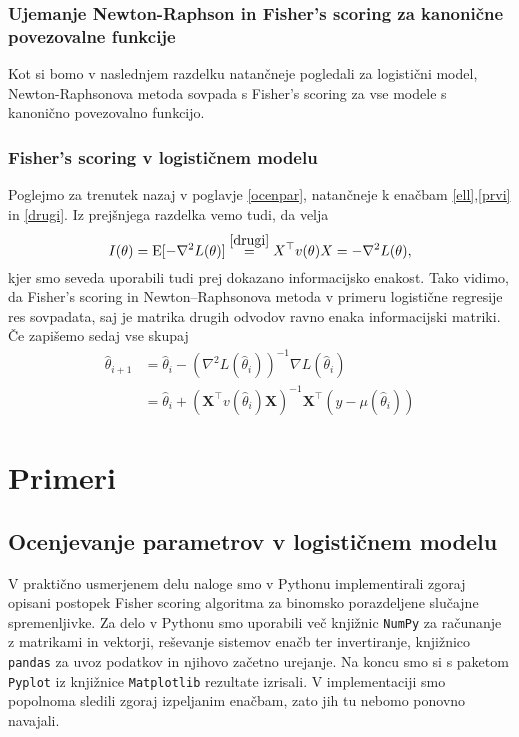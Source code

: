 \documentclass[12pt,a4paper]{amsart}
\theoremstyle{definition} %
\theoremstyle{plain} %
\begin{document}
\subsubsection{Ujemanje Newton-Raphson in Fisher's scoring za kanonične povezovalne funkcije}
Kot si bomo v naslednjem razdelku natančneje pogledali za logistični model, Newton-Raphsonova metoda sovpada s Fisher's scoring za vse modele s kanonično povezovalno funkcijo.



\subsubsection{Fisher's scoring v logističnem modelu}
Poglejmo za trenutek nazaj v poglavje \ref{ocenpar}, natančneje k enačbam \eqref{ell},\eqref{prvi} in \eqref{drugi}. Iz prejšnjega razdelka vemo tudi, da velja
\[
    I(\theta) = \mathrm{E}[-\nabla ^2 L(\theta)] \overset{\eqref{drugi}}{=} X^\top v(\theta)X = -\nabla ^2 L(\theta),
\]
kjer smo seveda uporabili tudi prej dokazano informacijsko enakost. Tako vidimo, da Fisher's scoring in Newton--Raphsonova metoda v primeru logistične regresije
res sovpadata, saj je matrika drugih odvodov ravno enaka informacijski matriki. Če zapišemo sedaj vse skupaj
\begin{align}
    \hat{\theta}_{i+1} &= \hat{\theta}_{i} - (\nabla^{2} L(\hat{\theta}_{i}))^{-1} \nabla L(\hat{\theta}_{i}) \nonumber \\
    &= \hat{\theta}_{i} + (\mathbf{X}^\top v(\hat{\theta}_{i}) \mathbf{X})^{-1}\mathbf{X}^\top(y - \mu(\hat{\theta}_{i})) 
\end{align}
\section{Primeri}
\subsection{Ocenjevanje parametrov v logističnem modelu}

V praktično usmerjenem delu naloge smo v Pythonu implementirali zgoraj opisani postopek Fisher scoring algoritma za binomsko porazdeljene slučajne
spremenljivke. Za delo v Pythonu smo uporabili več knjižnic\; \texttt{NumPy} za računanje z matrikami in vektorji, reševanje sistemov enačb ter invertiranje,
knjižnico \texttt{pandas} za uvoz podatkov in njihovo začetno urejanje. Na koncu smo si s paketom \texttt{Pyplot} iz knjižnice \texttt{Matplotlib} rezultate izrisali.
V implementaciji smo popolnoma sledili zgoraj izpeljanim enačbam, zato jih tu nebomo ponovno navajali.
\end{document}
